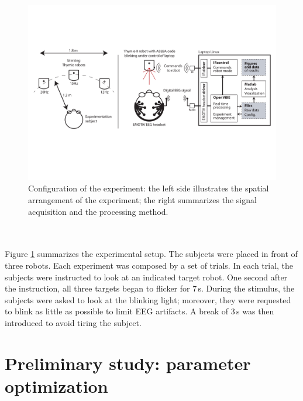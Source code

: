\documentclass[smallextended]{svjour3}
\begin{document}
\begin{figure} \center
\includegraphics[width=\textwidth]{figures/schema-global.pdf}
\caption{Configuration of the experiment: the left side illustrates the spatial arrangement of the experiment; the right summarizes the signal acquisition and the processing method.} \label{fig:thymioinstall}
\end{figure}\\
\\
Figure \ref{fig:thymioinstall} summarizes the experimental setup. 
The subjects were placed in front of three robots. 
Each experiment was composed by a set of trials. In each trial, the subjects were instructed to look at an indicated target robot. 
One second after the instruction, all three targets began to flicker for 7\,s. During the stimulus, the subjects were asked to look at the blinking light; moreover, they were requested to blink as little as possible to limit EEG artifacts. 
A break of 3\,s was then introduced to avoid tiring the subject. 

\section{Preliminary study: parameter optimization}
\label{sec:prestudy}
\end{document}
